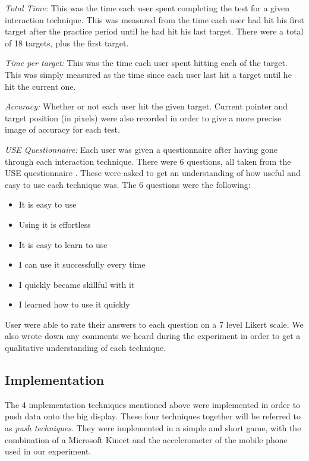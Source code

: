 \textit{Total Time:} This was the time each user spent completing the test for a given interaction technique.  This was measured from the time each user had hit his first target after the practice period until he had hit his last target. There were a total of 18 targets, plus the first target. 

\textit{Time per target:} This was the time each user spent hitting each of the target. This was simply measured as the time since each user last hit a target until he hit the current one.

\textit{Accuracy:} Whether or not each user hit the given target. Current pointer and target position (in pixels) were also recorded in order to give a more precise image of accuracy for each test. 

\textit{USE Questionnaire:} Each user was given a questionnaire after having gone through each interaction technique. There were 6 questions, all taken from the USE questionnaire \cite{lund2001measuring}. These were asked to get an understanding of how useful and easy to use each technique was. The 6 questions were the following: 


\begin{itemize}
	\item It is easy to use
	\item Using it is effortless
	\item It is easy to learn to use
	\item I can use it successfully every time
	\item I quickly became skillful with it
	\item I learned how to use it quickly
\end{itemize}

User were able to rate their answers to each question on a 7 level Likert scale. We also wrote down any comments we heard during the experiment in order to get a qualitative understanding of each technique.  

\subsection{Implementation}

The 4 implementation techniques mentioned above were implemented in order to push data onto the big display. These four techniques together will be referred to as \textit{push techniques}. They were implemented in a simple and short game, with the combination of a Microsoft Kinect and the accelerometer of the mobile phone used in our experiment. 

